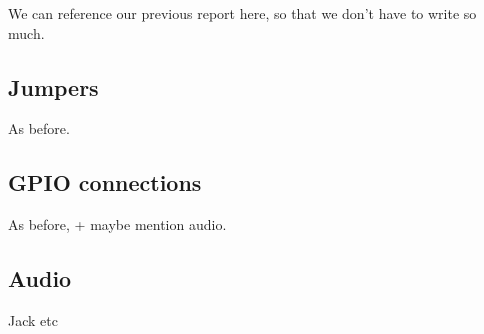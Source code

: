 We can reference our previous report here, so that we don't have to write so much.

\subsection{Jumpers}

As before.

\subsection{GPIO connections}

As before, + maybe mention audio.

\subsection{Audio}

Jack etc